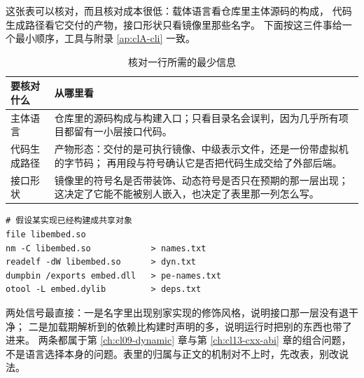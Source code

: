 \documentclass[12pt,a4paper,fontset=fandol]{ctexbook}
\begin{document}
这张表可以核对，而且核对成本很低：载体语言看仓库里主体源码的构成，
代码生成路径看它交付的产物，接口形状只看镜像里那些名字。
下面按这三件事给一个最小顺序，工具与附录 \ref{ap:clA-cli} 一致。

\begin{table}[htbp]
\centering
\begin{tabularx}{\textwidth}{@{}>{\raggedright\arraybackslash}p{} X@{}}
\toprule
要核对什么 & 从哪里看 \\
\midrule
主体语言 &
仓库里的源码构成与构建入口；只看目录名会误判，因为几乎所有项目都留有一小层接口代码。 \\
代码生成路径 &
产物形态：交付的是可执行镜像、中级表示文件，还是一份带虚拟机的字节码；
再用段与符号确认它是否把代码生成交给了外部后端。 \\
接口形状 &
镜像里的符号名是否带装饰、动态符号是否只在预期的那一层出现；
这决定了它能不能被别人嵌入，也决定了表里那一列怎么写。 \\
\bottomrule
\end{tabularx}
\caption{核对一行所需的最少信息}\label{tab:apC-verify}
\end{table}

\begin{lstlisting}[style=shellstyle, caption={核对接口形状：把实现当黑盒，只看它交付的镜像}]
# 假设某实现已经构建成共享对象
file libembed.so
nm -C libembed.so            > names.txt
readelf -dW libembed.so      > dyn.txt
dumpbin /exports embed.dll   > pe-names.txt
otool -L embed.dylib         > deps.txt
\end{lstlisting}

\begin{note}[title=什么时候该怀疑这一行写错了]
两处信号最直接：一是名字里出现别家实现的修饰风格，说明接口那一层没有退干净；
二是加载期解析到的依赖比构建时声明的多，说明运行时把别的东西也带了进来。
两条都属于第 \ref{ch:cl09-dynamic} 章与第 \ref{ch:cl13-cxx-abi} 章的组合问题，
不是语言选择本身的问题。表里的归属与正文的机制对不上时，先改表，别改说法。
\end{note}


\cleardoublepage
\end{document}
